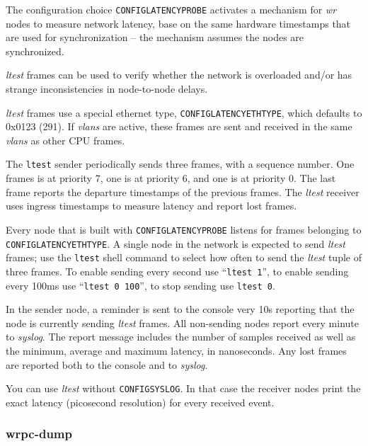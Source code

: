 \documentclass[a4paper, 12pt]{article}
\renewcommand{\_}{\underscore\allowbreak}
\begin{document}
\begin{sloppypar} %
The configuration choice \texttt{CONFIG\_LATENCY\_PROBE} activates a
mechanism for \textit{wr} nodes to measure network latency, base on the same
hardware timestamps that are used for synchronization -- the mechanism
assumes the nodes are synchronized.

\textit{ltest} frames can be used to verify whether the network is
overloaded and/or has strange inconsistencies in node-to-node delays.

\textit{ltest} frames use a special ethernet type, \texttt{CONFIG\_LATENCY\_ETHTYPE},
which defaults to 0x0123 (291). If \textit{vlans} are active, these frames
are sent and received in the same \textit{vlans} as other CPU frames.

The \texttt{ltest} sender periodically sends three frames, with a sequence
number. One frames is at priority 7, one is at priority 6, and one is
at priority 0. The last frame reports the departure timestamps of the
previous frames.  The \textit{ltest} receiver uses ingress timestamps to
measure latency and report lost frames.

Every node that is built with \texttt{CONFIG\_LATENCY\_PROBE} listens for frames
belonging to \texttt{CONFIG\_LATENCY\_ETHTYPE}.  A single node in the
network is expected to send \textit{ltest} frames; use the \texttt{ltest}
shell command to select how often to send the \textit{ltest} tuple of three
frames. To enable sending every second use ``\texttt{ltest 1}'', to enable
sending every 100ms use ``\texttt{ltest 0 100}'', to stop sending use
\texttt{ltest 0}.

In the sender node, a reminder is sent to the console very 10s
reporting that the node is currently sending \textit{ltest} frames.  All
non-sending nodes report every minute to \textit{syslog}. The
report message includes the number of samples received as well
as the minimum, average and maximum latency, in nanoseconds.
Any lost frames are reported both to the console and to \textit{syslog}.

You can use \textit{ltest} without \texttt{CONFIG\_SYSLOG}. In that case the
receiver nodes print the exact latency (picosecond resolution) for
every received event.
\end{sloppypar}

\subsubsection{wrpc-dump}
\label{wrpc-dump}
\end{document}
